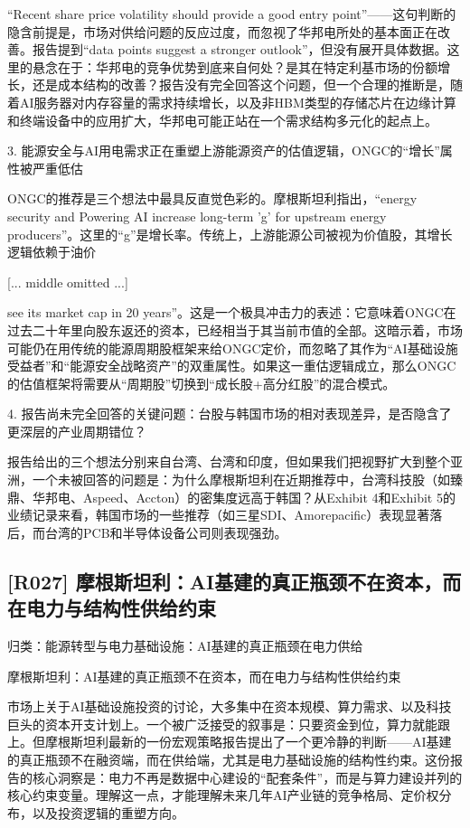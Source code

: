 \documentclass[11pt]{ctexart}
\begin{document}
“Recent share price volatility should provide a good entry point”——这句判断的隐含前提是，市场对供给问题的反应过度，而忽视了华邦电所处的基本面正在改善。报告提到“data points suggest a stronger outlook”，但没有展开具体数据。这里的悬念在于：华邦电的竞争优势到底来自何处？是其在特定利基市场的份额增长，还是成本结构的改善？报告没有完全回答这个问题，但一个合理的推断是，随着AI服务器对内存容量的需求持续增长，以及非HBM类型的存储芯片在边缘计算和终端设备中的应用扩大，华邦电可能正站在一个需求结构多元化的起点上。

3. 能源安全与AI用电需求正在重塑上游能源资产的估值逻辑，ONGC的“增长”属性被严重低估

ONGC的推荐是三个想法中最具反直觉色彩的。摩根斯坦利指出，“energy security and Powering AI increase long-term 'g' for upstream energy producers”。这里的“g”是增长率。传统上，上游能源公司被视为价值股，其增长逻辑依赖于油价

[... middle omitted ...]

 see its market cap in 20 years”。这是一个极具冲击力的表述：它意味着ONGC在过去二十年里向股东返还的资本，已经相当于其当前市值的全部。这暗示着，市场可能仍在用传统的能源周期股框架来给ONGC定价，而忽略了其作为“AI基础设施受益者”和“能源安全战略资产”的双重属性。如果这一重估逻辑成立，那么ONGC的估值框架将需要从“周期股”切换到“成长股+高分红股”的混合模式。

4. 报告尚未完全回答的关键问题：台股与韩国市场的相对表现差异，是否隐含了更深层的产业周期错位？

报告给出的三个想法分别来自台湾、台湾和印度，但如果我们把视野扩大到整个亚洲，一个未被回答的问题是：为什么摩根斯坦利在近期推荐中，台湾科技股（如臻鼎、华邦电、Aspeed、Accton）的密集度远高于韩国？从Exhibit 4和Exhibit 5的业绩记录来看，韩国市场的一些推荐（如三星SDI、Amorepacific）表现显著落后，而台湾的PCB和半导体设备公司则表现强劲。

\subsection{[R027] 摩根斯坦利：AI基建的真正瓶颈不在资本，而在电力与结构性供给约束}
{\small\color{refgray}归类：能源转型与电力基础设施：AI基建的真正瓶颈在电力供给}

摩根斯坦利：AI基建的真正瓶颈不在资本，而在电力与结构性供给约束

市场上关于AI基础设施投资的讨论，大多集中在资本规模、算力需求、以及科技巨头的资本开支计划上。一个被广泛接受的叙事是：只要资金到位，算力就能跟上。但摩根斯坦利最新的一份宏观策略报告提出了一个更冷静的判断——AI基建的真正瓶颈不在融资端，而在供给端，尤其是电力基础设施的结构性约束。这份报告的核心洞察是：电力不再是数据中心建设的“配套条件”，而是与算力建设并列的核心约束变量。理解这一点，才能理解未来几年AI产业链的竞争格局、定价权分布，以及投资逻辑的重塑方向。
\end{document}
